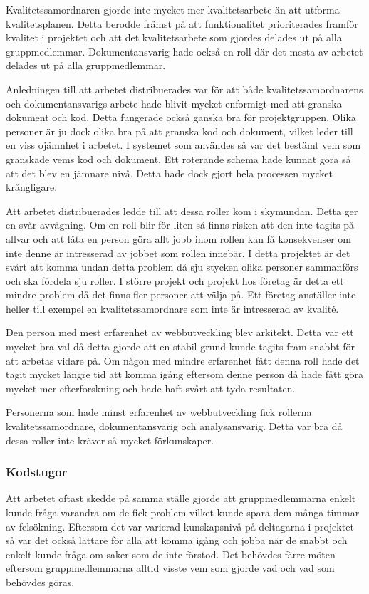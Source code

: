 \documentclass{article}
\begin{document}
Kvalitetssamordnaren gjorde inte mycket mer kvalitetsarbete än att utforma kvalitetsplanen. Detta berodde främst på att funktionalitet prioriterades framför kvalitet i projektet och att det kvalitetsarbete som gjordes delades ut på alla gruppmedlemmar. Dokumentansvarig hade också en roll där det mesta av arbetet delades ut på alla gruppmedlemmar. 

Anledningen till att arbetet distribuerades var för att både kvalitetssamordnarens och dokumentansvarigs arbete hade blivit mycket enformigt med att granska dokument och kod. Detta fungerade också ganska bra för projektgruppen. Olika personer är ju dock olika bra på att granska kod och dokument, vilket leder till en viss ojämnhet i arbetet. I systemet som användes så var det bestämt vem som granskade vems kod och dokument. Ett roterande schema hade kunnat göra så att det blev en jämnare nivå. Detta hade dock gjort hela processen mycket krångligare. 

Att arbetet distribuerades ledde till att dessa roller kom i skymundan. Detta ger en svår avvägning. Om en roll blir för liten så finns risken att den inte tagits på allvar och att låta en person göra allt jobb inom rollen kan få konsekvenser om inte denne är intresserad av jobbet som rollen innebär. I detta projektet är det svårt att komma undan detta problem då sju stycken olika personer sammanförs och ska fördela sju roller. I större projekt och projekt hos företag är detta ett mindre problem då det finns fler personer att välja på. Ett företag anställer inte heller till exempel en kvalitetssamordnare som inte är intresserad av kvalité.

Den person med mest erfarenhet av webbutveckling blev arkitekt. Detta var ett mycket bra val då detta gjorde att en stabil grund kunde tagits fram snabbt för att arbetas vidare på. Om någon med mindre erfarenhet fått denna roll hade det tagit mycket längre tid att komma igång eftersom denne person då hade fått göra mycket mer efterforskning och hade haft svårt att tyda resultaten. 

Personerna som hade minst erfarenhet av webbutveckling fick rollerna kvalitetssamordnare, dokumentansvarig och analysansvarig. Detta var bra då dessa roller inte kräver så mycket förkunskaper. 


\subsubsection{Kodstugor}
Att arbetet oftast skedde på samma ställe gjorde att gruppmedlemmarna enkelt kunde fråga varandra om de fick problem vilket kunde spara dem många timmar av felsökning. Eftersom det var varierad kunskapsnivå på deltagarna i projektet så var det också lättare för alla att komma igång och jobba när de snabbt och enkelt kunde fråga om saker som de inte förstod. Det behövdes färre möten eftersom gruppmedlemmarna alltid visste vem som gjorde vad och vad som behövdes göras.
\end{document}
